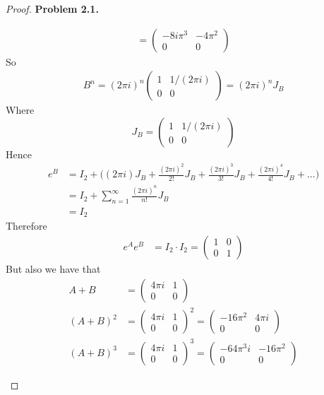 \documentclass[11pt]{article}
\theoremstyle{definition}
\begin{document}
\begin{proof}{\textbf{Problem 2.1.}}
\begin{itemize}
\begin{align*}
        = \begin{pmatrix} -8i\pi^3 & -4\pi^2\\ 0 & 0 \end{pmatrix}
    \end{align*}
    So
    \begin{align*}
        B^n = (2\pi i)^{n}\begin{pmatrix} 1 & 1/(2\pi i)\\ 0 & 0 \end{pmatrix}
        = (2\pi i)^{n}J_B
    \end{align*}
    Where
    $$J_B = \begin{pmatrix} 1 & 1/(2\pi i)\\ 0 & 0 \end{pmatrix}$$
    Hence
    \begin{align*}
        e^B &= I_2 + \bigg((2\pi i)J_B + \frac{(2\pi i)^2}{2!}J_B 
        + \frac{(2\pi i)^3}{3!}J_B + \frac{(2\pi i)^4}{4!}J_B +...\bigg)\\
        &= I_2 + \sum_{n=1}^\infty \frac{(2\pi i)^n}{n!}J_B\\
        &= I_2
    \end{align*}
    Therefore 
    \begin{align*}
        e^Ae^B &= I_2 \cdot I_2
        = \begin{pmatrix} 1 & 0\\ 0 & 1 \end{pmatrix}
    \end{align*}
    But also we have that 
    \begin{align*}
        A + B &= \begin{pmatrix} 4\pi i & 1\\ 0 & 0 \end{pmatrix}\\
        (A + B)^2 &= \begin{pmatrix} 4\pi i & 1\\ 0 & 0 \end{pmatrix}^2
        = \begin{pmatrix} -16\pi^2 & 4\pi i\\ 0 & 0 \end{pmatrix}\\
        (A + B)^3 &= \begin{pmatrix} 4\pi i & 1\\ 0 & 0 \end{pmatrix}^3
        = \begin{pmatrix} -64\pi^3 i & -16\pi^2\\ 0 & 0 \end{pmatrix}

\end{align*}
\end{itemize}
\end{proof}
\end{document}

